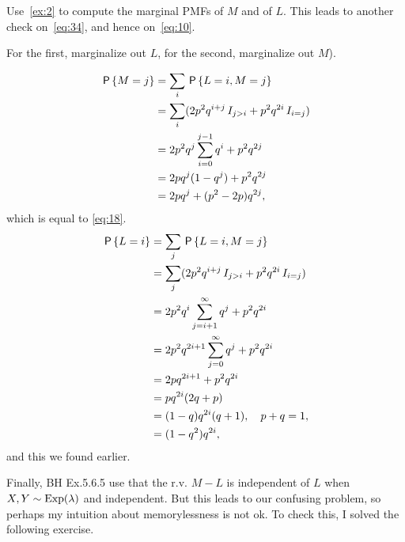 \documentclass[a4paper,12pt]{article}
\begin{document}
\begin{exercise}\label{ex:8}
Use~\cref{ex:2} to compute the marginal PMFs of $M$ and of $L$. This leads to another check on~\cref{eq:34}, and hence on~\cref{eq:10}. 
\begin{hint}
For the first, marginalize out $L$, for the second, marginalize out $M$).
\end{hint}
\begin{solution}
  \begin{align}
\,\mathsf{P}\left\{M=j\right\}    
&= \sum_{i} \,\mathsf{P}\left\{L=i, M=j\right\} \\
 &= \sum_{i} (2p^{2}q^{i+j}\,I_{j>i}+ p^{2}q^{2i}\,I_{i=j}) \\
 &= 2p^2q^j\sum_{i=0}^{j-1} q^{i}+ p^{2}q^{2j} \label{eq:38}\\
 &= 2pq^j (1-q^{j})+ p^{2}q^{2j} \\
 &= 2pq^j + (p^{2}-2p) q^{2j},
  \end{align}
which is equal to \cref{eq:18}.
  \begin{align}
\,\mathsf{P}\left\{L=i\right\}    
&= \sum_{j} \,\mathsf{P}\left\{L=i, M=j\right\} \\
 &= \sum_{j} (2p^{2}q^{i+j}\,I_{j>i}+ p^{2}q^{2i}\,I_{i=j}) \\
 &= 2p^2q^i\sum_{j=i+1}^{\infty} q^{j}+ p^{2}q^{2i} \\
 &= 2p^{2}q^{2i+1} \sum_{j=0}^{\infty}q^{j}+ p^{2}q^{2i} \\
 &= 2pq^{2i+1} + p^{2} q^{2i}\\
 &= pq^{2i}(2q+p)\\
 &= (1-q)q^{2i}(q + 1), \quad p+q=1,\\
 &= (1-q^{2})q^{2i},
  \end{align}
and this we found earlier.
\end{solution}
\end{exercise}


Finally, BH Ex.5.6.5 use that the r.v.
$M-L$ is independent of $L$ when $X, Y\sim\mathrm{Exp}(\lambda)$ and independent.
But this leads to our confusing problem, so perhaps my intuition about memorylessness is not ok.
To check this, I solved  the following exercise.  
\end{document}
